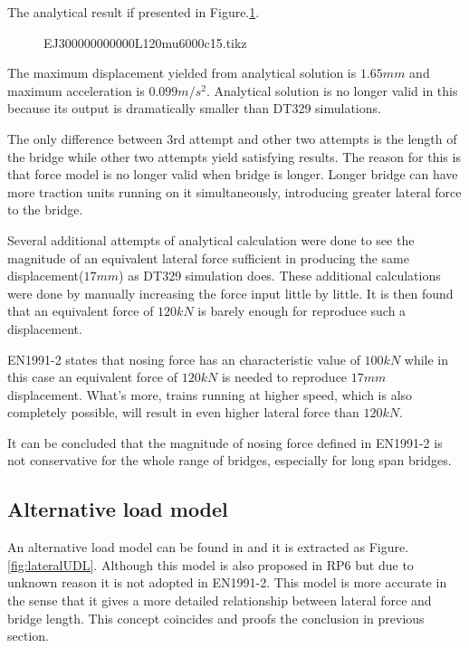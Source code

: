 The analytical result if presented in Figure.\ref{fig:EJ300000000000L120mu6000c15}.

\begin{figure}[h!]
\centering 
\setlength\figureheight{6cm} 
\setlength\figurewidth{6cm} 
 
\caption{EJ300000000000L120mu6000c15.tikz} 
\label{fig:EJ300000000000L120mu6000c15} 
\end{figure}

The maximum displacement yielded from analytical solution is $1.65mm$ and maximum acceleration is $0.099m/s^2$. Analytical solution is no longer valid in this because its output is dramatically smaller than DT329 simulations. 

The only difference between 3rd attempt and other two attempts is the length of the bridge while other two attempts yield satisfying results. The reason for this is that force model is no longer valid when bridge is longer. Longer bridge can have more traction units running on it simultaneously, introducing greater lateral force to the bridge. 

Several additional attempts of analytical calculation were done to see the magnitude of an equivalent lateral force sufficient in producing the same displacement($17mm$) as DT329 simulation does. These additional calculations were done by manually increasing the force input little by little. It is then found that an equivalent force of $120kN$ is barely enough for reproduce such a displacement.

EN1991-2 states that nosing force has an characteristic value of $100kN$ while in this case an equivalent force of $120kN$ is needed to reproduce $17mm$ displacement. What's more, trains running at higher speed, which is also completely possible, will result in even higher lateral force than $120kN$.

It can be concluded that the magnitude of nosing force defined in EN1991-2 is not conservative for the whole range of bridges, especially for long span bridges. 

\subsection{Alternative load model}

An alternative load model can be found in \cite[Figure.4.1]{d181} and it is extracted as Figure.\ref{fig:lateralUDL}. Although this model is also proposed in RP6 but due to unknown reason it is not adopted in EN1991-2. This model is more accurate in the sense that it gives a more detailed relationship between lateral force and bridge length. This concept coincides and proofs the conclusion in previous section.

